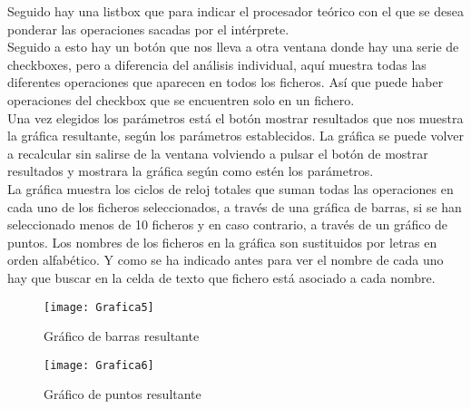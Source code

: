 Seguido hay una listbox que para indicar el procesador teórico con el que se desea ponderar  las operaciones sacadas por el intérprete.\\
Seguido a esto hay un botón que nos lleva a otra ventana donde hay una serie de checkboxes, pero a diferencia del análisis individual, aquí muestra todas las diferentes operaciones que aparecen en todos los ficheros. Así que puede haber operaciones del checkbox que se encuentren solo en un fichero.\\
Una vez elegidos los parámetros está el botón mostrar resultados que nos muestra la gráfica resultante, según los parámetros establecidos. La gráfica se  puede volver a recalcular sin salirse de la ventana volviendo a  pulsar el botón de mostrar resultados y mostrara la gráfica según como estén los parámetros.\\

La gráfica muestra los ciclos de reloj totales que suman todas las operaciones en cada uno de los ficheros seleccionados, a través de una gráfica de barras, si se han seleccionado menos de 10 ficheros y en caso contrario, a través de un gráfico de puntos. Los nombres de los ficheros en la gráfica son sustituidos por letras en orden alfabético. Y como se ha indicado antes para ver el nombre de cada uno hay que buscar en la celda de texto que fichero está asociado a cada nombre.\\

\begin{figure}[H]
\centering
\texttt{[image: Grafica5]}
\caption{Gráfico de barras resultante}
\end{figure}

\begin{figure}[H]
\centering
\texttt{[image: Grafica6]}
\caption{Gráfico de puntos resultante}
\end{figure}



